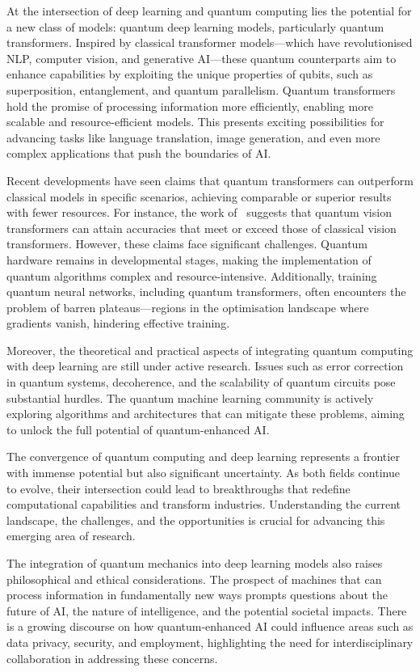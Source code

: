 At the intersection of deep learning and quantum computing lies the
potential for a new class of models: quantum deep learning models,
particularly quantum transformers. Inspired by classical transformer
models—which have revolutionised NLP, computer vision, and generative
AI—these quantum counterparts aim to enhance capabilities by
exploiting the unique properties of qubits, such as superposition,
entanglement, and quantum parallelism. Quantum transformers hold the
promise of processing information more efficiently, enabling more
scalable and resource-efficient models. This presents exciting
possibilities for advancing tasks like language translation, image
generation, and even more complex applications that push the boundaries of AI.

Recent developments have seen claims that quantum transformers can
outperform classical models in specific scenarios, achieving
comparable or superior results with fewer resources. For instance,
the work of~\citet{Cherrat_2024} suggests that quantum vision
transformers can attain accuracies that meet or exceed those of
classical vision transformers. However, these claims face significant
challenges. Quantum hardware remains in developmental stages, making
the implementation of quantum algorithms complex and
resource-intensive. Additionally, training quantum neural networks,
including quantum transformers, often encounters the problem of
barren plateaus—regions in the optimisation landscape where gradients
vanish, hindering effective training.

Moreover, the theoretical and practical aspects of integrating
quantum computing with deep learning are still under active research.
Issues such as error correction in quantum systems, decoherence, and
the scalability of quantum circuits pose substantial hurdles. The
quantum machine learning community is actively exploring algorithms
and architectures that can mitigate these problems, aiming to unlock
the full potential of quantum-enhanced AI.

The convergence of quantum computing and deep learning represents a
frontier with immense potential but also significant uncertainty. As
both fields continue to evolve, their intersection could lead to
breakthroughs that redefine computational capabilities and transform
industries. Understanding the current landscape, the challenges, and
the opportunities is crucial for advancing this emerging area of research.

The integration of quantum mechanics into deep learning models also
raises philosophical and ethical considerations. The prospect of
machines that can process information in fundamentally new ways
prompts questions about the future of AI, the nature of intelligence,
and the potential societal impacts. There is a growing discourse on
how quantum-enhanced AI could influence areas such as data privacy,
security, and employment, highlighting the need for interdisciplinary
collaboration in addressing these concerns.

